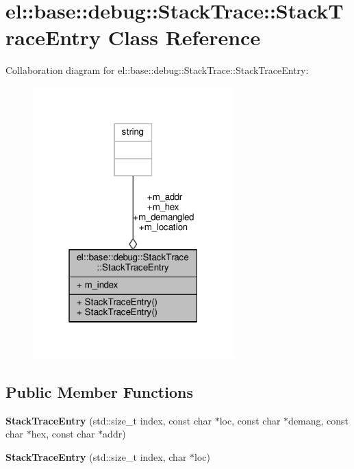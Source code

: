 \hypertarget{classel_1_1base_1_1debug_1_1StackTrace_1_1StackTraceEntry}{}\section{el\+:\+:base\+:\+:debug\+:\+:Stack\+Trace\+:\+:Stack\+Trace\+Entry Class Reference}
\label{classel_1_1base_1_1debug_1_1StackTrace_1_1StackTraceEntry}


Collaboration diagram for el\+:\+:base\+:\+:debug\+:\+:Stack\+Trace\+:\+:Stack\+Trace\+Entry\+:
\nopagebreak
\begin{figure}[H]
\begin{center}
\leavevmode
\includegraphics[width=220pt]{d3/da3/classel_1_1base_1_1debug_1_1StackTrace_1_1StackTraceEntry__coll__graph}
\end{center}
\end{figure}
\subsection*{Public Member Functions}
\begin{DoxyCompactItemize}
\item 
{\bfseries Stack\+Trace\+Entry} (std\+::size\+\_\+t index, const char $\ast$loc, const char $\ast$demang, const char $\ast$hex, const char $\ast$addr)\hypertarget{classel_1_1base_1_1debug_1_1StackTrace_1_1StackTraceEntry_a49b21719794ee5de7f70e2558ebcba9e}{}\label{classel_1_1base_1_1debug_1_1StackTrace_1_1StackTraceEntry_a49b21719794ee5de7f70e2558ebcba9e}

\item 
{\bfseries Stack\+Trace\+Entry} (std\+::size\+\_\+t index, char $\ast$loc)\hypertarget{classel_1_1base_1_1debug_1_1StackTrace_1_1StackTraceEntry_a9fbf0675fe713b1ac4ec692bbe661afe}{}\label{classel_1_1base_1_1debug_1_1StackTrace_1_1StackTraceEntry_a9fbf0675fe713b1ac4ec692bbe661afe}

\end{DoxyCompactItemize}
